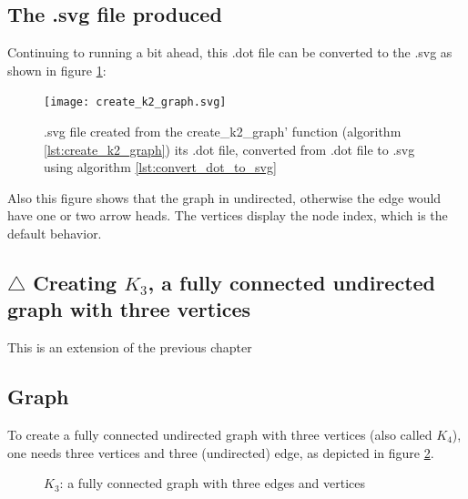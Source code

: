 \subsection{The .svg file produced}
\label{subsec:create_k2.svg}

Continuing to running a bit ahead, 
this .dot file can be converted to the .svg 
as shown in figure \ref{fig:create_k2_graph.svg}:

\begin{figure}[!htbp]
  \texttt{[image: create\_k2\_graph.svg]}
  \caption{.svg file created from the create\_k2\_graph' function (algorithm \ref{lst:create_k2_graph}) its .dot file, converted from .dot file to .svg using algorithm \ref{lst:convert_dot_to_svg}}
  \label{fig:create_k2_graph.svg}
\end{figure}

Also this figure shows that the graph in undirected, otherwise the edge
 would have one or two arrow heads.
 The vertices display the node index, which is the default behavior.

\subsection{$\triangle$ Creating $K_{3}$, a fully connected undirected graph with three vertices}
\label{subsec:create_k3_graph}

This is an extension of the previous chapter

\subsection{Graph}

To create a fully connected undirected graph with three vertices 
(also called $K_{4}$), 
one needs three vertices and three (undirected) edge, 
as depicted in figure \ref{fig:create_k3_graph}.

\begin{figure}
  \caption{$K_{3}$: a fully connected graph with three edges and vertices }
  \label{fig:create_k3_graph}
\end{figure}

